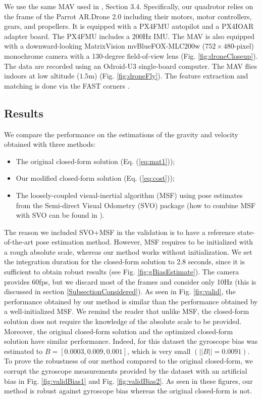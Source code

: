 \documentclass[letterpaper, 10 pt, journal, twoside]{IEEEtran}  %
\begin{document}
We use the same MAV used in \cite{FaesslerICRA15}, Section 3.4.
Specifically, our quadrotor relies on the frame of the Parrot AR.Drone 2.0 including their motors, motor controllers, gears, and propellers.
It is equipped with a PX4FMU autopilot and a PX4IOAR adapter board.
The PX4FMU includes a 200Hz IMU.
The MAV is also equipped with a downward-looking MatrixVision mvBlueFOX-MLC200w ($752 \times 480$-pixel) monochrome camera with a 130-degree field-of-view lens (Fig. \ref{fig:droneCloseup}).
The data are recorded using an Odroid-U3 single-board computer.
The MAV flies indoors at low altitude ($1.5$m) (Fig. \ref{fig:droneFly}).
The feature extraction and matching is done via the FAST corners \cite{Rosten2005, Rosten2006}.

\subsection{Results}

We compare the performance on the estimations of the gravity and velocity obtained with three methods:
\begin{itemize}
\item The original closed-form solution \cite{Martinelli2014} (Eq. (\ref{eq:mat1}));
\item Our modified closed-form solution (Eq. (\ref{eq:cost}));
\item The loosely-coupled visual-inertial algorithm (MSF) \cite{LynenIROS13} using pose estimates from the Semi-direct Visual Odometry (SVO) package \cite{Forster2014} (how to combine MSF with SVO can be found in \cite{FaesslerICRA15}).
\end{itemize}
The reason we included SVO+MSF in the validation is to have a reference state-of-the-art pose estimation method.
However, MSF requires to be initialized with a rough absolute scale, whereas our method works without initialization.
We set the integration duration for the closed-form solution to 2.8 seconds, since it is sufficient to obtain robust results (see Fig. \ref{fig:gBiasEstimate}).
The camera provides 60fps, but we discard most of the frames and consider only 10Hz (this is discussed in section \ref{SubsectionConsidered}).
As seen in Fig. \ref{fig:valid}, the performance obtained by our method is similar than the performance obtained by a well-initialized MSF.
We remind the reader that unlike MSF, the closed-form solution does not require the knowledge of the absolute scale to be provided.
Moreover, the original closed-form solution and the optimized closed-form solution have similar performance.
Indeed, for this dataset the gyroscope bias was estimated to $B = [0.0003, 0.009, 0.001]$, which is very small $(||B|| = 0.0091)$.
To prove the robustness of our method compared to the original closed-form,
we corrupt the gyroscope measurements provided by the dataset with an artificial bias in Fig. \ref{fig:validBias1} and Fig. \ref{fig:validBias2}.
As seen in these figures, our method is robust against gyroscope bias whereas the original closed-form is not.
\end{document}
